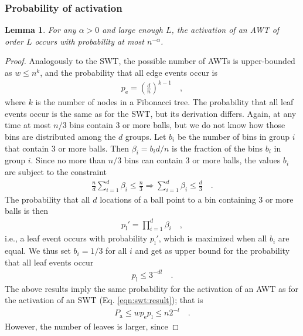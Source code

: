 \documentclass[a4paper,12pt]{article}
\newtheorem{lemma}{Lemma}
\begin{document}
\subsubsection{Probability of activation}
\label{sec:analysis:probabilityAsymWT}
\begin{lemma}\label{lemma:awt:activation}
For any $\alpha>0$ and large enough $L$, the activation of an AWT of order $L$ occurs with probability at most $n^{-\alpha}$.
\end{lemma}

\begin{proof}
Analogously to the SWT, the possible number of AWTs is upper-bounded as $w\leq	n^k$, and the probability that all edge events occur is
\begin{align*}
p_\mathrm{e} = \left(\frac{d}{n}\right)^{k-1}\quad ,
\end{align*}
where $k$ is the number of nodes in a Fibonacci tree. The probability that all leaf events occur is the same as for the SWT, but its derivation differs. Again, at any time at most $n/3$ bins contain 3 or more balls, but we do not know how those bins are distributed among the $d$ groups. Let $b_i$ be the number of bins in group $i$ that contain 3 or more balls. Then $\beta_i = b_i d/ n$ is the fraction of the bins $b_i$ in group $i$. Since no more than $n/3$ bins can contain 3 or more balls, the values $b_i$ are subject to the constraint
\begin{align*}
\frac{n}{d}\sum_{i=1}^d \beta_i \leq \frac{n}{3} \Rightarrow
\sum_{i=1}^d \beta_i \leq \frac{d}{3}\quad .
\end{align*}
The probability that all $d$ locations of a ball point to a bin containing 3 or more balls is then 
\begin{align*}
p_\mathrm{l}' = \prod_{i=1}^{d} \beta_i \quad ,
\end{align*}
i.e., a leaf event occurs with probability $p_\mathrm{l}'$, which is maximized when all $b_i$ are equal. We thus set $b_i = 1/3$ for all $i$ and get as upper bound for the probability that all leaf events occur 
\begin{align*}
p_\mathrm{l} \leq 3^{-d l}\quad .
\end{align*}
The above results imply the same probability for the activation of an AWT as for the activation of an SWT (Eq. \ref{eqn:swt:result}); that is
\begin{align*}
P_\mathrm{a} \leq wp_\mathrm{e}p_\mathrm{l} \leq n  2^{-l}\quad .
\end{align*}
However, the number of leaves is larger, since 

\end{proof}
\end{document}
